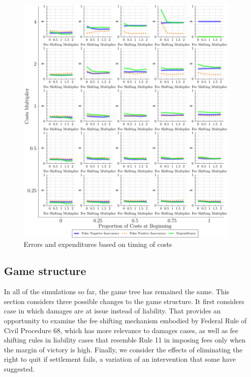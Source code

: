 \documentclass{article}
\begin{document}
\begin{figure}
\begin{minipage}{0.48\textwidth}
        \includegraphics[width=0.98\textwidth, scale=0.70, trim={0in 0in 0in 0in}, clip]{../Figures/Accuracy and Expenditures Varying Proportion of Costs at Beginning} %
        \caption{Errors and expenditures based on timing of costs}
		\label{fig:accexp_timing}
    \end{minipage}
\end{figure}

\subsection{Game structure}

In all of the simulations so far, the game tree has remained the same. This section considers three possible changes to the game structure. It first considers case in which damages are at issue instead of liability. That provides an opportunity to examine the fee shifting mechanism embodied by Federal Rule of Civil Procedure 68, which has more relevance to damages cases, as well as fee shifting rules in liability cases that resemble Rule 11 in imposing fees only when the margin of victory is high. Finally, we consider the effects of eliminating the right to quit if settlement fails, a variation of an intervention that some have suggested.
\end{document}
